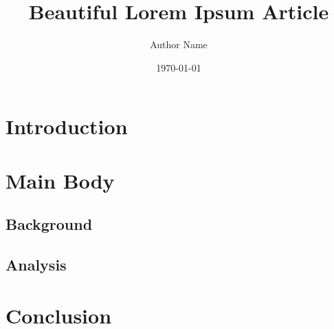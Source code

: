 \documentclass[12pt,a4paper]{article}
\begin{document}
\title{Beautiful Lorem Ipsum Article}
\author{Author Name}
\date{\today}
\maketitle

\section{Introduction}
\lipsum[1-2]

\section{Main Body}
\subsection{Background}
\lipsum[3-4]

\subsection{Analysis}
\lipsum[5-6]

\section{Conclusion}
\lipsum[7-8]
\end{document}
